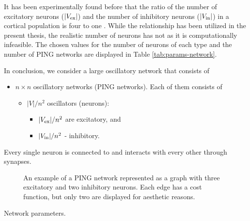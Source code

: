 It has been experimentally found before that the ratio of the number of excitatory neurons ($|V_{\mathrm{ex}}|$) and the number of inhibitory neurons ($|V_{\mathrm{in}}|$) in a cortical population is four to one \cite{Pastore2018}. While the relationship has been utilized in the present thesis, the realistic number of neurons has not as it is computationally infeasible. The chosen values for the number of neurons of each type and the number of PING networks are displayed in Table \ref{tab:params-network}.

In conclusion, we consider a large oscillatory network that consists of
\startbulletsnospace
\begin{itemize}
    \item $n \times n$ oscillatory networks (PING networks). Each of them consists of
    \vspace{-0.5em}
    \begin{itemize}
        \item $|V| / n^2$ oscillators (neurons):
        \begin{itemize}
            \item $|V_{\mathrm{ex}}| / n^2$ are excitatory, and
            \item $|V_{\mathrm{in}}| / n^2$ - inhibitory.
        \end{itemize}
    \end{itemize}
\end{itemize}
\startbulletsnospace
Every single neuron is connected to and interacts with every other through synapses. 

\begin{figure}[H]
    \centering
    
    \caption[PING network as a graph]{An example of a PING network represented as a graph with three excitatory and two inhibitory neurons. Each edge has a cost function, but only two are displayed for aesthetic reasons.}
    \label{fig:single-ping-graph}
\end{figure}

\begin{table}[H]
    \centering
    
    \caption{Network parameters.}
    \label{tab:params-network}
\end{table}